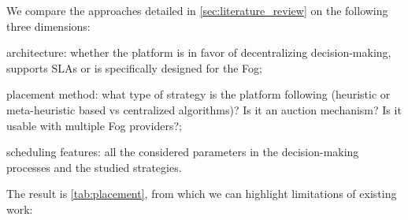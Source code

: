 \documentclass[11pt]{sdm}
\begin{document}
We compare the approaches detailed in \cref{sec:literature_review} on the following three dimensions:
\begin{enumerate*}[(1)]
	\item architecture: whether the platform is in favor of decentralizing decision-making, supports \glspl{SLA} or is specifically designed for the Fog;
	\item placement method: what type of strategy is the platform following (heuristic or meta-heuristic based vs centralized algorithms)? Is it an auction mechanism? Is it usable with multiple Fog providers?;
	\item scheduling features: all the considered parameters in the decision-making processes and the studied strategies.
\end{enumerate*}
The result is \cref{tab:placement}, from which we can highlight limitations of existing work:
\end{document}
